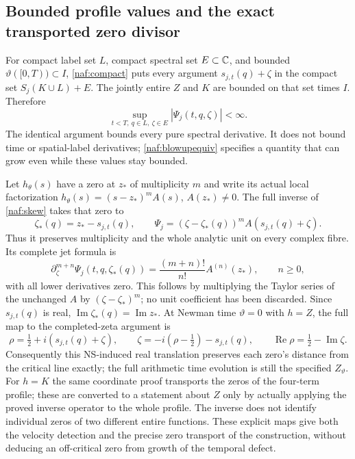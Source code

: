 \subsection{Bounded profile values and the exact transported zero divisor}

For compact label set $L$, compact spectral set $E\subset\mathbb C$, and
bounded $\vartheta([0,T))\subset I$, \eqref{naf:compact} puts every
argument $s_{j,t}(q)+\zeta$ in the compact set $S_j(K\cup L)+E$.
The jointly entire $Z$ and $K$ are bounded on that set times $I$.
Therefore
\[
 \sup_{t<T,\ q\in L,\ \zeta\in E}|\Psi_j(t,q,\zeta)|<\infty.
\]
The identical argument bounds every pure spectral derivative. It does
not bound time or spatial-label derivatives; \eqref{naf:blowupequiv}
specifies a quantity that can grow even while these values stay bounded.

Let $h_\theta(s)$ have a zero at $z_*$ of multiplicity $m$ and write its
actual local factorization
$h_\theta(s)=(s-z_*)^m A(s)$, $A(z_*)\ne0$. The full inverse of
\eqref{naf:skew} takes that zero to
\[
 \zeta_*(q)=z_*-s_{j,t}(q),\qquad
 \Psi_j=(\zeta-\zeta_*(q))^m A(s_{j,t}(q)+\zeta).
\]
Thus it preserves multiplicity and the whole analytic unit on every
complex fibre. Its complete jet formula is
\[
 \partial_\zeta^{m+n}\Psi_j(t,q,\zeta_*(q))
                 =\frac{(m+n)!}{n!}A^{(n)}(z_*),\qquad n\geq0,
\]
with all lower derivatives zero. This follows by multiplying the
Taylor series of the unchanged $A$ by $(\zeta-\zeta_*)^m$; no unit
coefficient has been discarded. Since $s_{j,t}(q)$ is real,
$\operatorname{Im}\zeta_*(q)=\operatorname{Im}z_*$. At Newman time
$\vartheta=0$ with $h=Z$, the full map to the completed-zeta argument is
\[
 \rho=\tfrac12+i(s_{j,t}(q)+\zeta),\qquad
 \zeta=-i(\rho-\tfrac12)-s_{j,t}(q),\qquad
 \operatorname{Re}\rho=\tfrac12-\operatorname{Im}\zeta.
\]
Consequently this NS-induced real translation preserves each zero's
distance from the critical line exactly; the full arithmetic time
evolution is still the specified $Z_\vartheta$. For $h=K$ the same
coordinate proof transports the zeros of the four-term profile; these
are converted to a statement about $Z$ only by actually applying the
proved inverse operator to the whole profile. The inverse does not
identify individual zeros of two different entire functions. These
explicit maps give both the velocity detection and the precise zero
transport of the construction, without deducing an off-critical zero
from growth of the temporal defect.
